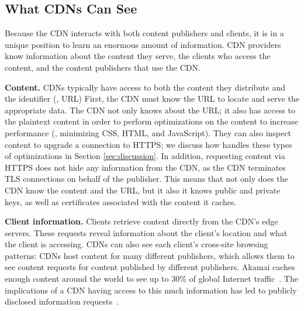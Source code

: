 
\subsection{What CDNs Can See}
\label{sec:info}

Because the CDN interacts with both content publishers and clients, it is in a unique position to learn an enormous amount of information. CDN providers know information about the content they serve, the clients who access the content, and the content publishers that use the CDN.

\textbf{Content.}  CDNs typically have access to both the content they distribute and the identifier (\ie, URL) First, the CDN must know the URL to locate and serve the appropriate data. The CDN not only knows about the URL; it also 
has access to the plaintext content in order to perform optimizations on the content
to increase performance (\eg, minimizing CSS, HTML, and JavaScript).  
They can also inspect content to upgrade a connection to HTTPS; we discuss how 
\system{} handles these types of optimizations
in Section \ref{sec:discussion}. In addition, requesting content via HTTPS does not hide any information from the CDN, as the CDN terminates TLS connections on behalf of the publisher.  This means that not only does the CDN know the content and the URL, but it also it knows public and private keys, as well as certificates associated with the content it caches.  

\textbf{Client information.} Clients retrieve content directly from the
CDN's edge servers. These requests reveal information about the client's location and what the client is accessing. CDNs can also see each client's cross-site browsing patterns: CDNs host content for many different publishers, which allows them to see content requests for content published by different publishers.  Akamai caches enough content around the world to see up to 30\% of global Internet 
traffic~\cite{akamai_global_traffic}. The implications of a CDN having access to
this much information has led to publicly disclosed information requests~\cite{cloudflare_nsl}.

